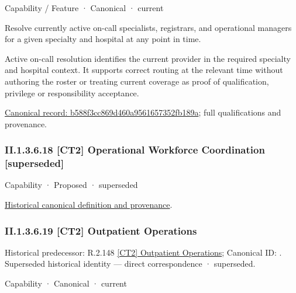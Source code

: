 \label{element:b588f3cc869d460a9561657352fb189a}
{\small Capability / Feature · Canonical · current}\par

Resolve currently active on-call specialists, registrars, and operational managers for a given specialty and hospital at any point in time.



Active on-call resolution identifies the current provider in the required specialty and hospital context. It supports correct routing at the relevant time without authoring the roster or treating current coverage as proof of qualification, privilege or responsibility acceptance.


{\footnotesize \href{../../../../continuum/strategy/capability/feature/b588f3cc869d460a9561657352fb189a.md}{Canonical record: b588f3cc869d460a9561657352fb189a}; full qualifications and provenance.}\par
\subsubsection*{II.1.3.6.18 [CT2] Operational Workforce Coordination [superseded]}
\label{navigation:II.1.3.6.18}

\label{element:66e72222f2064a23adbdb0311092918b}
{\small Capability · Proposed · superseded}\par
\href{../../../../continuum/strategy/capability/66e72222f2064a23adbdb0311092918b.md}{Historical canonical definition and provenance}.\par
\subsubsection*{II.1.3.6.19 [CT2] Outpatient Operations}
\label{navigation:II.1.3.6.19}

{\small Historical predecessor: R.2.148 \hyperref[element:3db41bc06ade4f9088eec7b8aedd7448]{[CT2] Outpatient Operations}; Canonical ID: \texttt{}. Superseded historical identity — direct correspondence · superseded.}\par
\label{element:21399d52b9624ddfbeb786f1d72e40c3}
{\small Capability · Canonical · current}\par


